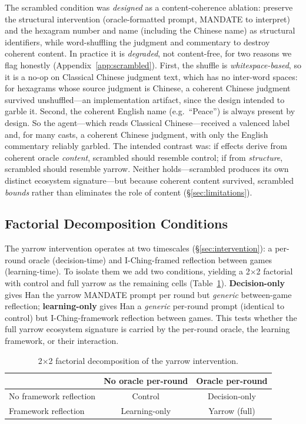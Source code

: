 \documentclass[11pt]{article}
\begin{document}
The scrambled condition was \emph{designed} as a content-coherence ablation: preserve the structural intervention (oracle-formatted prompt, \textsc{MANDATE} to interpret) and the hexagram number and name (including the Chinese name) as structural identifiers, while word-shuffling the judgment and commentary to destroy coherent content. In practice it is \emph{degraded}, not content-free, for two reasons we flag honestly (Appendix~\ref{app:scrambled}). First, the shuffle is \emph{whitespace-based}, so it is a no-op on Classical Chinese judgment text, which has no inter-word spaces: for hexagrams whose source judgment is Chinese, a coherent Chinese judgment survived unshuffled---an implementation artifact, since the design intended to garble it. Second, the coherent English name (e.g.\ ``Peace'') is always present by design. So the agent---which reads Classical Chinese---received a valenced label and, for many casts, a coherent Chinese judgment, with only the English commentary reliably garbled. The intended contrast was: if effects derive from coherent oracle \emph{content}, scrambled should resemble control; if from \emph{structure}, scrambled should resemble yarrow. Neither holds---scrambled produces its own distinct ecosystem signature---but because coherent content survived, scrambled \emph{bounds} rather than eliminates the role of content (\S\ref{sec:limitations}).

\subsection{Factorial Decomposition Conditions}
\label{sec:factorial-design}

The yarrow intervention operates at two timescales (\S\ref{sec:intervention}): a per-round oracle (decision-time) and I-Ching-framed reflection between games (learning-time). To isolate them we add two conditions, yielding a 2$\times$2 factorial with control and full yarrow as the remaining cells (Table~\ref{tab:factorial-design}). \textbf{Decision-only} gives Han the yarrow \textsc{MANDATE} prompt per round but \emph{generic} between-game reflection; \textbf{learning-only} gives Han a \emph{generic} per-round prompt (identical to control) but I-Ching-framework reflection between games. This tests whether the full yarrow ecosystem signature is carried by the per-round oracle, the learning framework, or their interaction.

\begin{table}[h]
\centering
\caption{2$\times$2 factorial decomposition of the yarrow intervention.}
\label{tab:factorial-design}
\begin{tabular}{lcc}
\toprule
 & No oracle per-round & Oracle per-round \\
\midrule
No framework reflection & Control & Decision-only \\
Framework reflection & Learning-only & Yarrow (full) \\
\bottomrule
\end{tabular}
\end{table}
\end{document}
